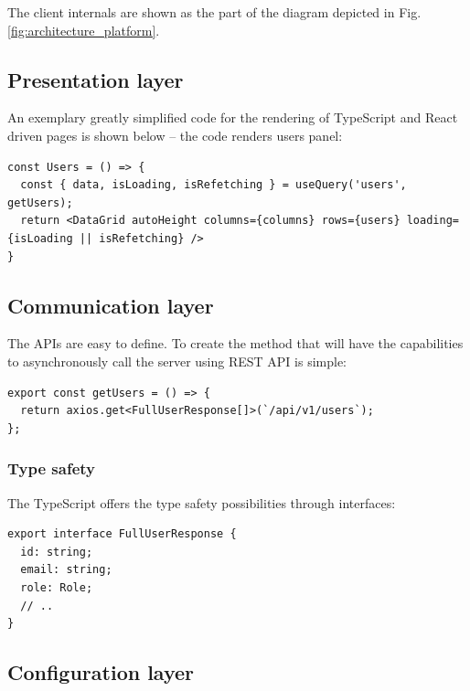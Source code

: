 \documentclass[a4paper,twoside,12pt]{book}
\begin{document}
The client internals are shown as the part of the diagram depicted in Fig. \ref{fig:architecture_platform}.

\subsection{Presentation layer}

An exemplary greatly simplified code for the rendering of TypeScript and React driven pages is shown below -- the code renders users panel:

\begin{verbatim}
const Users = () => {
  const { data, isLoading, isRefetching } = useQuery('users', getUsers);
  return <DataGrid autoHeight columns={columns} rows={users} loading={isLoading || isRefetching} />
}
\end{verbatim}

\subsection{Communication layer}

The APIs are easy to define. To create the method that will have the capabilities to asynchronously call the server using REST API is simple:
\begin{verbatim}
export const getUsers = () => {
  return axios.get<FullUserResponse[]>(`/api/v1/users`);
};
\end{verbatim}

\subsubsection{Type safety}
The TypeScript offers the type safety possibilities through interfaces:
\begin{verbatim}
export interface FullUserResponse {
  id: string;
  email: string;
  role: Role;
  // ..
}
\end{verbatim}

\subsection{Configuration layer}
\end{document}

